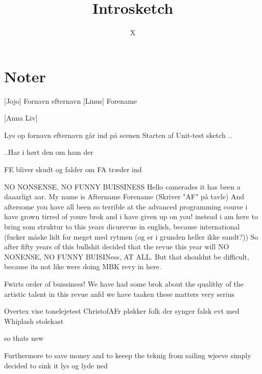 \documentclass{article}
\title{Introsketch}
\author{X}
\begin{document}
                
\maketitle
\section*{Noter}                %
\begin{roles}
[Jojo] Fornavn efternavn
[Linus] Forename

[Anna Liv]
\end{roles}

\begin{props}

\prop{} 
\end{props}

\newpage%
\begin{sketch}

\scene Lys op
\scene fornavn efternavn går ind på scenen
 Starten af Unit-test sketch .. 

 ..Har i hørt den om ham der

\scene FE bliver skudt og falder om
\scene FA træder ind

 NO NONSENSE, NO FUNNY BUISSINESS
Hello camerades it has been a daaarligt aar.
My name is Aftername Forename (Skriver "AF" på tavle) 
 And aftersome you have all been so terrible at the advanced programming course i have grown tirred of youre brok and i have  given up on you!
instead i am here to bring som struktur to this years dicurevue
in english, because international (fucker måske lidt for meget med rytmen (og er i grunden heller ikke sandt?))
So after fifty years of this bullshit decided that the revue this year will NO NONENSE, NO FUNNY BUISINess, AT ALL. 
But that shouldnt be difficult, because its not like were doing MBK revy in here.

 Fwirts order of buissiness! We have had some brok about the qualithy of the artistic talent in this revue anfd we have taaken these matters very serius

\scene  Overtex vise tonelejetest ChristofAFr pløkker folk der synger falsk  evt med Whiplash stolekast

so thats new

Furthermore to save money and to keeep the teknig from sailing wjeeve simply decided to sink it
\scene lys og lyde ned




\end{sketch}
\end{document}
